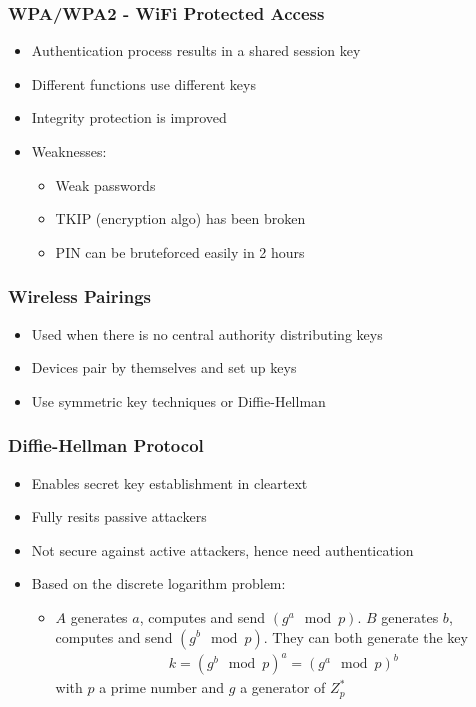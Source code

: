 \subsubsection{WPA/WPA2 - WiFi Protected Access}
\begin{itemize}
	\item Authentication process results in a shared session key
	\item Different functions use different keys
	\item Integrity protection is improved
	\item Weaknesses:
	\begin{itemize}
		\item Weak passwords
		\item TKIP (encryption algo) has been broken
		\item PIN can be bruteforced easily in 2 hours
	\end{itemize}
\end{itemize}
\subsubsection{Wireless Pairings}
\begin{itemize}
	\item Used when there is no central authority distributing keys
	\item Devices pair by themselves and set up keys
	\item Use symmetric key techniques or Diffie-Hellman
\end{itemize}
\subsubsection{Diffie-Hellman Protocol}
\begin{itemize}
	\item Enables secret key establishment in cleartext
	\item Fully resits passive attackers
	\item Not secure against active attackers, hence need authentication
	\item Based on the discrete logarithm problem:
	\begin{itemize}
		\item $A$ generates $a$, computes and send $(g^a \mod p)$. $B$ generates $b$, computes and send $(g^b \mod p)$. They can both generate the key
		\begin{align*}
			k = (g^b \mod p)^a = (g^a \mod p )^b
		\end{align*}
		with $p$ a prime number and $g$ a generator of $Z_p^*$
	\end{itemize}
\end{itemize}

